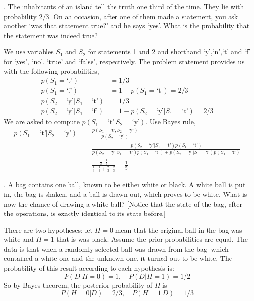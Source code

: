 \documentclass[a4paper]{article}
\begin{document}
\begin{ExerciseList}

\Exercise[label={ex:inhabitants},origin={DM04, ex.2.36}]. The inhabitants of an island tell the
 truth one third of the time. They lie with  probability  2/3.
 On an occasion, after one of them made a statement,
 you ask another `was that statement true?'
 and he says `yes'. What is the probability that the statement was indeed true?

\Answer[ref={ex:inhabitants}] We use variables $S_1$ and $S_2$ for statements 1 and 2 and shorthand `y',`n',`t' and `f' for `yes', `no', `true' and `false', respectively. The problem statement provides us with the following probabilities,
\begin{align*}
p(S_1=\text{`t'})&= 1/3\\
p(S_1=\text{`f'})&= 1 - p(S_1=\text{`t'})= 2/3\\
p(S_2=\text{`y'}|S_1=\text{`t'})&= 1/3 \\
p(S_2=\text{`y'}|S_1=\text{`f'})&= 1-p(S_2=\text{`y'}|S_1=\text{`t'})= 2/3
\end{align*}
We are asked to compute $p(S_1=\text{`t'}|S_2=\text{`y'})$. Use Bayes rule,
\begin{align*}
p(S_1=\text{`t'}|S_2=\text{`y'}) &= \frac{p(S_1=\text{`t'},S_2=\text{`y'})}{p(S_2=\text{`y'})}\\
&=\frac{p(S_2=\text{`y'}|S_1=\text{`t'})p(S_1=\text{`t'})}{p(S_2=\text{`y'}|S_1=\text{`t'})p(S_1=\text{`t'})+p(S_2=\text{`y'}|S_1=\text{`f'})p(S_1=\text{`f'})}\\
&= \frac{\frac{1}{3}\cdot\frac{1}{3}}{\frac{1}{3}\cdot\frac{1}{3}+\frac{2}{3}\cdot\frac{2}{3}} = \frac{1}{5}
\end{align*}

\Exercise[label={ex:bagcounter},origin={DM04, ex.3.12}]. A bag contains one ball, known to be
 either white or black. A white ball is put in, the bag is shaken,
 and a ball is drawn out, which proves to be white. What is now the
 chance of drawing a white ball? [Notice that
 the state of the bag, after the operations, is exactly identical to its state before.]

\Answer[ref={ex:bagcounter}] There are two hypotheses: let $H = 0$ mean
that the original ball in the bag was white and $H = 1$ that is was black.
Assume the prior probabilities are equal. The data is that when a randomly
selected ball was drawn from the bag, which contained a white one and
the unknown one, it turned out to be white. The probability of this result
according to each hypothesis is:
$$ P(D|H =0) = 1,\quad P(D|H =1) = 1/2$$
So by Bayes theorem, the posterior probability of $H$ is
$$P(H =0|D) = 2/3,\quad P(H =1|D) = 1/3$$


\end{ExerciseList}
\end{document}
